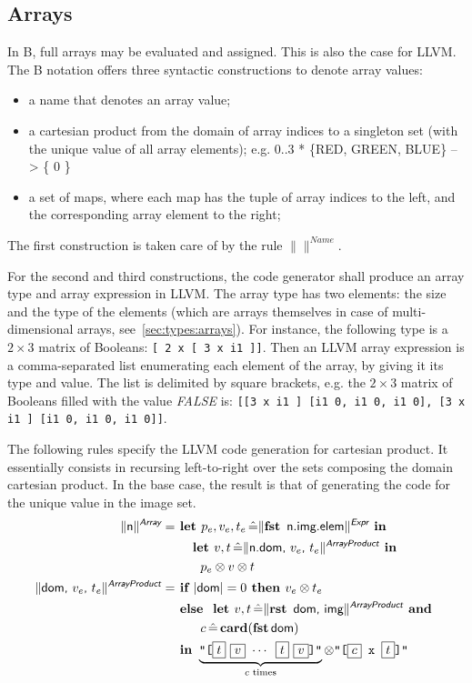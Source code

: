 \documentclass{article}
\newcommand{\trad}[2]{\ensuremath{\lVert \textsf{#1} \rVert^{\textit{#2}}}}
\newcommand{\llvm}[1]{\texttt{#1}}
\newcommand{\B}[1]{\textsf{#1}}
\newcommand{\IF}[0]{\textbf{ if }}
\newcommand{\ELSE}[0]{\textbf{ else }}
\newcommand{\THEN}[0]{\textbf{ then }}
\newcommand{\LET}[0]{\textbf{ let }}
\DeclareMathOperator{\BE}{\hat{=}}
\newcommand{\IN}[0]{\textbf{ in }}
\newcommand{\AND}[0]{\textbf{ and }}
\newcommand{\PH}[1]{\framebox{$#1$}}
\newcommand{\sep}[0]{\otimes}
\begin{document}
\subsection{Arrays}

In B, full arrays may be evaluated and assigned. This is also the case
for LLVM. The B notation offers three syntactic constructions to
denote array values:
\begin{itemize}
\item a name that denotes an array value;
\item a cartesian product from the domain of array indices to a
  singleton set (with the unique value of all array elements); e.g.
  \B{0..3 * \{RED, GREEN, BLUE\} --> \{ 0 \}}
\item a set of maps, where each map has the tuple of array indices to
  the left, and the corresponding array element to the right;
\end{itemize}
The first construction is taken care of by the rule \trad{}{Name}.

For the second and third constructions, the code generator shall
produce an array type and array expression in LLVM. The array type has
two elements: the size and the type of the elements (which are arrays
themselves in case of multi-dimensional arrays,
see~\ref{sec:types:arrays}). For instance, the following type is a $2
\times 3$ matrix of Booleans: \llvm{[ 2 x [ 3 x i1 ]]}.  Then an LLVM
array expression is a comma-separated list enumerating each element of
the array, by giving it its type and value. The list is delimited by
square brackets, e.g. the $2 \times 3$  matrix of Booleans filled with
the value \textit{FALSE\/} is:
\llvm{[[3 x i1 ] [i1 0, i1 0, i1 0], [3 x i1 ] [i1 0, i1 0, i1 0]]}.

The following rules specify the LLVM code generation for cartesian
product. It essentially consists in recursing left-to-right over the
sets composing the domain cartesian product. In the base case, the
result is that of generating the code for the unique value in the
image set.
\begin{align*}
\trad{n}{\B{Array}} =
& \LET p_e, v_e, t_e \BE \trad{\fst\, n.img.elem}{\B{Expr}} \IN \\ 
& \quad \LET v, t \BE \trad{n.dom, $v_e$, $t_e$}{\B{ArrayProduct}} \IN \\
& \quad \quad p_e \sep v \sep t \\
\trad{dom, $v_e$, $t_e$}{\B{ArrayProduct}} = 
& \IF |\B{dom}| = 0 \THEN v_e \sep t_e \\
& \ELSE \LET v, t \BE \trad{\rst\, dom, img}{\B{ArrayProduct}} \AND \\
& \quad \quad c \BE \card(\fst\, \B{dom}) \\
& \IN \underbrace{\llvm{"[\PH{t}\,\,\PH{v} $\cdots$ \PH{t}\,\,\PH{v}]"}}_{c \text{ times}}
\sep \llvm{"[\PH{c} x \PH{t}]"}
\end{align*}
\end{document}
